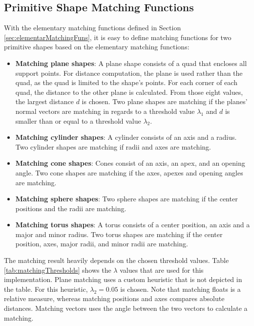 \subsection{Primitive Shape Matching Functions}
\label{sec:primitiveShapeMatchingFuns}

With the elementary matching functions defined in Section \ref{sec:elementarMatchingFuns}, it is easy to define matching functions for two primitive shapes based on the elementary matching functions:

\begin{itemize}
\item \textbf{Matching plane shapes}: 
A plane shape consists of a quad that encloses all support points. For distance computation, the plane is used rather than the quad, as the quad is limited to the shape's points. For each corner of each quad, the distance to the other plane is calculated. From those eight values, the largest distance $d$ is chosen. Two plane shapes are matching if the planes' normal vectors are matching in regards to a threshold value $\lambda_1$ and $d$ is smaller than or equal to a threshold value $\lambda_2$.
\item \textbf{Matching cylinder shapes}: 
A cylinder consists of an axis and a radius. Two cylinder shapes are matching if radii and axes are matching. 
\item \textbf{Matching cone shapes}:
Cones consist of an axis, an apex, and an opening angle. Two cone shapes are matching if the axes, apexes and opening angles are matching. 
\item \textbf{Matching sphere shapes}: 
Two sphere shapes are matching if the center positions and the radii are matching. 
\item \textbf{Matching torus shapes}: 
A torus consists of a center position, an axis and a major and minor radius. Two torus shapes are matching if the center position, axes, major radii, and minor radii are matching. 
\end{itemize}

The matching result heavily depends on the chosen threshold values. Table \ref{tab:matchingThresholds} shows the $\lambda$ values that are used for this implementation. Plane matching uses a custom heuristic that is not depicted in the table. For this heuristic, $\lambda_2 = 0.05$ is chosen. Note that matching floats is a relative measure, whereas matching positions and axes compares absolute distances. Matching vectors uses the angle between the two vectors to calculate a matching. 

